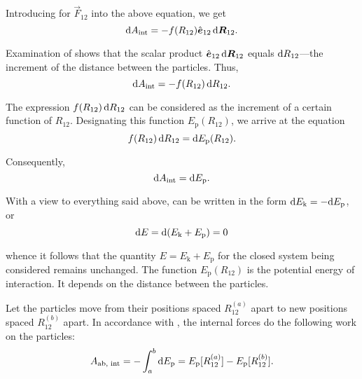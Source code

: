 \noindent
Introducing  for $\vec{F}_{12}$ into the above equation, we get
\begin{equation*}
\mathrm{d} A_{\text{int}} = - f(R_{12}) \hat{\boldsymbol{e}}_{12} \, \mathrm{d}\boldsymbol{R}_{12}.
\end{equation*}

\noindent
Examination of  shows that the scalar product $\hat{\boldsymbol{e}}_{12}\,\mathrm{d}\boldsymbol{R}_{12}$ equals $\mathrm{d} R_{12}$---the increment of the distance between the particles. Thus,
\begin{equation}\label{eq:3_44}
\mathrm{d} A_{\text{int}} = - f(R_{12})\,\mathrm{d} R_{12}.
\end{equation}


The expression $f(R_{12})\,\mathrm{d} R_{12}$ can be considered as the increment of a certain function of $R_{12}$. Designating this function $E_{\text{p}}(R_{12})$, we arrive at the equation
\begin{equation}\label{eq:3_45}
f(R_{12})\,\mathrm{d} R_{12} = \mathrm{d} E_{\text{p}}(R_{12}).
\end{equation}

\noindent
Consequently,
\begin{equation}\label{eq:3_46}
\mathrm{d} A_{\text{int}} = \mathrm{d} E_{\text{p}}.
\end{equation}

With a view to everything said above,  can be written in the form $\mathrm{d} E_{\text{k}}=-\mathrm{d} E_{\text{p}}$, or
\begin{equation}\label{eq:3_47}
\mathrm{d} E = \mathrm{d}(E_{\text{k}}+E_{\text{p}}) = 0
\end{equation}

\noindent
whence it follows that the quantity $E=E_{\text{k}}+E_{\text{p}}$ for the closed system being considered remains unchanged. The function $E_{\text{p}}(R_{12})$ is the potential energy of interaction. It depends on the distance between the particles.

Let the particles move from their positions spaced $R_{12}^{(a)}$ apart to new positions spaced $R_{12}^{(b)}$ apart. In accordance with , the internal forces do the following work on the particles:
\begin{equation}\label{eq:3_48}
A_{\text{ab, int}} = - \int_{a}^{b} \mathrm{d} E_{\text{p}} = E_{\text{p}}[R_{12}^{(a)}] - E_{\text{p}}[R_{12}^{(b)}].
\end{equation}

